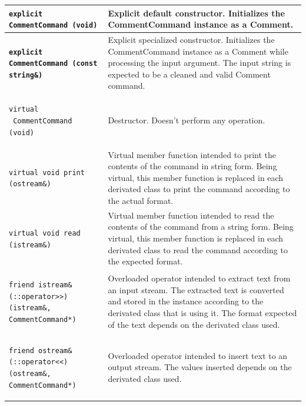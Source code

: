 \documentclass[11pt,twoside,openany,x11names,svgnames]{memoir}
\begin{document}
\begin{table}[h]\footnotesize
\centering
\begin{tabular}{| >{\bfseries}p{8.5cm} | p{7cm} |}
	\hline
	
	\texttt{explicit CommentCommand (void)} & Explicit default constructor. Initializes the CommentCommand instance as a Comment. \\
	
	\hline
	
	\texttt{explicit CommentCommand (const string\&)} & Explicit specialized constructor. Initializes the CommentCommand instance as a Comment while processing the input argument. The input string is expected to be a cleaned and valid Comment command. \\
	
	\hline
	
	\texttt{virtual ~CommentCommand (void)} & Destructor. Doesn't perform any operation. \\
	
	\hline
	
	\texttt{virtual void print (ostream\&)} & Virtual member function intended to print the contents of the command in string form. Being virtual, this member function is replaced in each derivated class to print the command according to the actual format. \\
	
	\hline
	
	\texttt{virtual void read (istream\&)} & Virtual member function intended to read the contents of the command from a string form. Being virtual, this member function is replaced in each derivated class to read the command according to the expected format. \\
	
	\hline	
		
	\texttt{friend istream\& (::operator>>) (istream\&, CommentCommand*)} & Overloaded operator intended to extract text from an input stream. The extracted text is converted and stored in the instance according to the derivated class that is using it. The format expected of the text depends on the derivated class used. \\
	
	\hline
	
	\texttt{friend ostream\& (::operator<<) (ostream\&, CommentCommand*)} & Overloaded operator intended to insert text to an output stream. The values inserted depends on the derivated class used. \\
	

\end{tabular}
\end{table}
\end{document}
